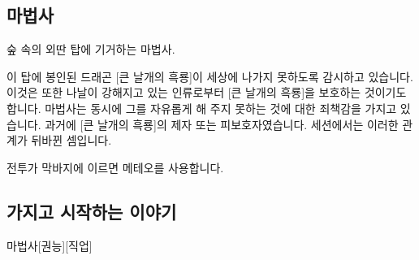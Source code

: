 \documentclass{report}
\begin{document}
	\subsection*{마법사}
		숲 속의 외딴 탑에 기거하는 마법사.

		이 탑에 봉인된 드래곤 [큰 날개의 흑룡]이 세상에 나가지 못하도록 감시하고 있습니다. 이것은 또한 나날이 강해지고 있는 인류로부터 [큰 날개의 흑룡]을 보호하는 것이기도 합니다. 마법사는 동시에 그를 자유롭게 해 주지 못하는 것에 대한 죄책감을 가지고 있습니다. 과거에 [큰 날개의 흑룡]의 제자 또는 피보호자였습니다. 세션에서는 이러한 관계가 뒤바뀐 셈입니다.
		
		전투가 막바지에 이르면 메테오를 사용합니다.
	
	\subsection*{가지고 시작하는 이야기}
		\begin{spoiler}{마법사}{[권능][직업]}
			
			
		\end{spoiler}
	
		
\end{document}
